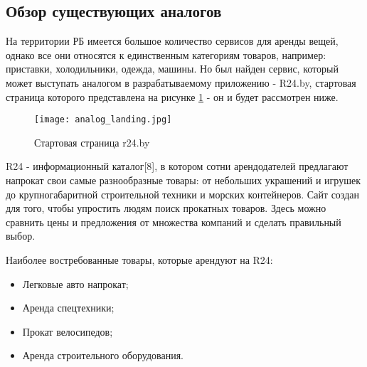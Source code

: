 \subsection{Обзор существующих аналогов}
На территории РБ имеется большое количество сервисов для аренды вещей, однако все они относятся к единственным категориям товаров, например: приставки, холодильники, одежда, машины.
Но был найден сервис, который может выступать аналогом в разрабатываемому приложению - R24.by, стартовая страница которого представлена на рисунке \ref{analogue:start} - он и будет рассмотрен ниже.

\begin{figure}[!htb]
  \centering
      \texttt{[image: analog\_landing.jpg]}
      \caption{Стартовая страница r24.by}
      \label{analogue:start}
\end{figure}


R24 - информационный каталог[8], в котором сотни арендодателей предлагают напрокат свои самые разнообразные товары: от небольших украшений и игрушек до крупногабаритной строительной техники и морских контейнеров.
Сайт создан для того, чтобы упростить людям поиск прокатных товаров.
Здесь можно сравнить цены и предложения от множества компаний и сделать правильный выбор.

Наиболее востребованные товары, которые арендуют на R24:
\begin{itemize}
  \item Легковые авто напрокат;
  \item Аренда спецтехники;
  \item Прокат велосипедов;
  \item Аренда строительного оборудования.
\end{itemize}


